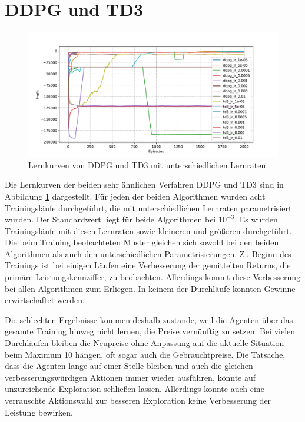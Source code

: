\section{DDPG und TD3}
\label{section:main_ddpg}
\begin{figure}[htb]
	\centering
	\includegraphics[width=\textwidth]{main/ddpg_td3.pdf}
	\caption{Lernkurven von DDPG und TD3 mit unterschiedlichen Lernraten}
	\label{graphic:DDPGLearningCurve}
\end{figure}

Die Lernkurven der beiden sehr ähnlichen Verfahren DDPG und TD3 sind in Abbildung \ref{graphic:DDPGLearningCurve} dargestellt.
Für jeden der beiden Algorithmen wurden acht Trainingsläufe durchgeführt, die mit unterschiedlichen Lernraten parametrisiert wurden.
Der Standardwert liegt für beide Algorithmen bei $10^{-3}$.
Es wurden Trainingsläufe mit diesen Lernraten sowie kleineren und größeren durchgeführt.
Die beim Training beobachteten Muster gleichen sich sowohl bei den beiden Algorithmen als auch den unterschiedlichen Parametrisierungen.
Zu Beginn des Trainings ist bei einigen Läufen eine Verbesserung der gemittelten Returns, die primäre Leistungskennziffer, zu beobachten.
Allerdings kommt diese Verbesserung bei allen Algorithmen zum Erliegen.
In keinem der Durchläufe konnten Gewinne erwirtschaftet werden.

Die schlechten Ergebnisse kommen deshalb zustande, weil die Agenten über das gesamte Training hinweg nicht lernen, die Preise vernünftig zu setzen.
Bei vielen Durchläufen bleiben die Neupreise ohne Anpassung auf die aktuelle Situation beim Maximum 10 hängen, oft sogar auch die Gebrauchtpreise.
Die Tatsache, dass die Agenten lange auf einer Stelle bleiben und auch die gleichen verbesserungswürdigen Aktionen immer wieder ausführen, könnte auf unzureichende Exploration schließen lassen.
Allerdings konnte auch eine verrauschte Aktionswahl zur besseren Exploration keine Verbesserung der Leistung bewirken.

